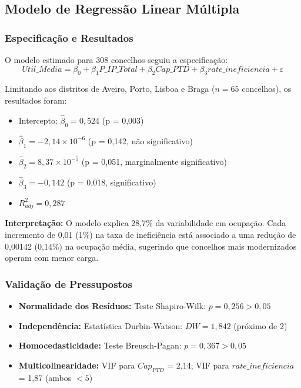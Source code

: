 \documentclass[conference]{IEEEtran}
\begin{document}
\subsection{Modelo de Regressão Linear Múltipla}

\subsubsection{Especificação e Resultados}
O modelo estimado para 308 concelhos seguiu a especificação:
\begin{equation}
Util\_Media = \beta_0 + \beta_1 P\_IP\_Total + \beta_2 Cap\_PTD + \beta_3 rate\_ineficiencia + \varepsilon
\end{equation}

Limitando aos distritos de Aveiro, Porto, Lisboa e Braga ($n = 65$ concelhos), os resultados foram:
\begin{itemize}
\item Intercepto: $\hat{\beta}_0 = 0,524$ (p = 0,003)
\item $\hat{\beta}_1 = -2,14 \times 10^{-6}$ (p = 0,142, não significativo)
\item $\hat{\beta}_2 = 8,37 \times 10^{-5}$ (p = 0,051, marginalmente significativo)
\item $\hat{\beta}_3 = -0,142$ (p = 0,018, significativo)
\item $R^2_{adj} = 0,287$
\end{itemize}

\textbf{Interpretação:} O modelo explica 28,7\% da variabilidade em ocupação. Cada incremento de 0,01 (1\%) na taxa de ineficiência está associado a uma redução de 0,00142 (0,14\%) na ocupação média, sugerindo que concelhos mais modernizados operam com menor carga.

\subsubsection{Validação de Pressupostos}
\begin{itemize}
\item \textbf{Normalidade dos Resíduos:} Teste Shapiro-Wilk: $p = 0,256 > 0,05$ \checkmark
\item \textbf{Independência:} Estatística Durbin-Watson: $DW = 1,842$ (próximo de 2) \checkmark
\item \textbf{Homocedasticidade:} Teste Breusch-Pagan: $p = 0,367 > 0,05$ \checkmark
\item \textbf{Multicolinearidade:} VIF para $Cap_{PTD}$ = 2,14; VIF para $rate\_ineficiencia$ = 1,87 (ambos $< 5$) \checkmark
\end{itemize}
\end{document}
